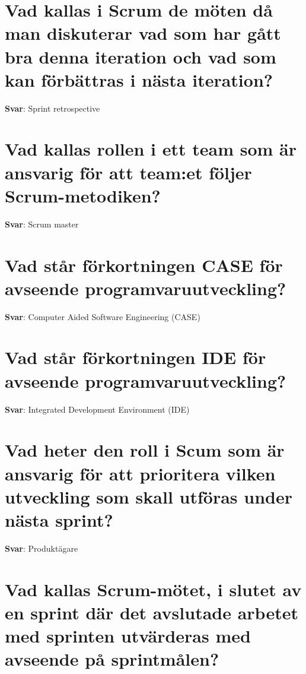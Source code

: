 \documentclass[a4paper,11pt,oneside]{book}
\begin{document}
\begin{sloppypar}
\section{Vad kallas i Scrum de m\"oten d\r{a} man diskuterar vad som har g\r{a}tt bra denna iteration och vad som kan f\"orb\"attras i n\"asta iteration?}

\label{q:45:sa:sv:True}

\textbf{Svar}: Sprint retrospective



\section{Vad kallas rollen i ett team som \"ar ansvarig f\"or att team:et f\"oljer Scrum-metodiken?}

\label{q:46:sa:sv:True}

\textbf{Svar}: Scrum master



\section{Vad st\r{a}r f\"orkortningen CASE f\"or avseende programvaruutveckling?}

\label{q:47:sa:sv:True}

\textbf{Svar}: Computer Aided Software Engineering (CASE)



\section{Vad st\r{a}r f\"orkortningen IDE f\"or avseende programvaruutveckling?}

\label{q:48:sa:sv:True}

\textbf{Svar}: Integrated Development Environment (IDE)



\section{Vad heter den roll i Scum som \"ar ansvarig f\"or att prioritera vilken utveckling som skall utf\"oras under n\"asta sprint?}

\label{q:49:sa:sv:True}

\textbf{Svar}: Produkt\"agare



\section{Vad kallas Scrum-m\"otet, i slutet av en sprint d\"ar det avslutade arbetet med sprinten utv\"arderas med avseende p\r{a} sprintm\r{a}len?}


\end{sloppypar}
\end{document}
